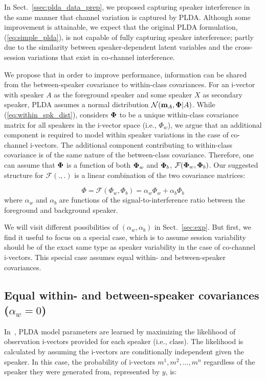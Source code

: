 In Sect.~\ref{ssec:plda_data_prep}, we proposed capturing speaker interference in the same manner that channel variation is captured by PLDA. 
Although some improvement is attainable, we expect that the original PLDA formulation, (\ref{eq:simple_plda}), is not capable of fully capturing speaker interference; partly due to the similarity between speaker-dependent latent variables and the cross-session variations that exist in co-channel interference. 

We propose that in order to improve performance, information can be shared from the between-speaker covariance to within-class covariances. 
For an i-vector with speaker $A$ as the foreground speaker and some speaker $X$ as secondary speaker, PLDA assumes a normal distribution $\mathcal{N} ({\bf m}_A,{\bf \Phi} | A)$. 
While (\ref{eq:within_spk_dist}), considers ${\bf \Phi}$ to be a unique within-class covariance matrix for all speakers in the i-vector space (i.e., $\Phi_w$), we argue that an additional component is required to model within speaker variations in the case of co-channel i-vectors. 
The additional component contributing to within-class covariance is of the same nature of the between-class covariance. 
Therefore, one can assume that ${\bf \Phi}$ is a function of both ${\bf \Phi}_w$ and ${\bf \Phi}_b$, $ \mathcal{F} ({\bf \Phi}_w,{\bf \Phi}_b)$. 
Our suggested structure for $ \mathcal{F} (.,.)$ is a linear combination of the two covariance matrices: 

\begin{equation}
\label{eq:complex_phiw}
\Phi = \mathcal{F} (\Phi_w,\Phi_b) = 
\alpha_w\Phi_w + \alpha_b\Phi_b
\end{equation}
where $\alpha_w$ and $\alpha_b$ are functions of the signal-to-interference ratio between the foreground and background speaker. 

We will visit different possibilities of $(\alpha_w, \alpha_b)$ in Sect.~\ref{sec:exp}. But first, we find it useful to focus on a special case, which is to assume session variability should be of the exact same type as speaker variability in the case of co-channel i-vectors. 
This special case assumes equal within- and between-speaker covariances. 

\subsection{Equal within- and between-speaker covariances ($\alpha_w = 0$)}
\label{ssec:alpha_w_0}
In~\cite{ioffePLDA2006}, PLDA model parameters are learned by maximizing the likelihood of observation i-vectors provided for each speaker (i.e., class). 
The likelihood is calculated by assuming the i-vectors are conditionally independent given the speaker. 
In this case, the probability of i-vectors $m^1, m^2, ..., m^n$ regardless of the speaker they were generated from, represented by $y$, is:

